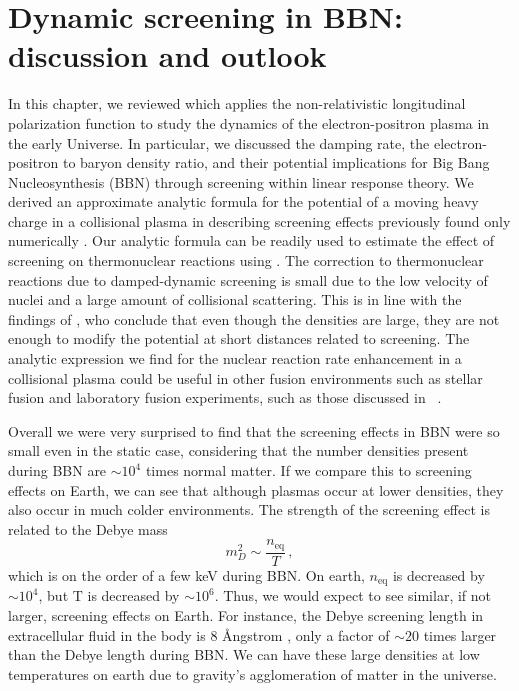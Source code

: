\section{Dynamic screening in BBN: discussion and outlook}\label{sec:Discussion}

In this chapter, we reviewed \cite{Grayson:2023flr} which applies the non-relativistic longitudinal polarization function to study the dynamics of the electron-positron plasma in the early Universe. In particular, we discussed the damping rate, the electron-positron to baryon density ratio, and their potential implications for Big Bang Nucleosynthesis (BBN) through screening within linear response theory. We derived an approximate analytic formula for the potential of a moving heavy charge in a collisional plasma in  describing screening effects previously found only numerically \cite{Hwang:2021kno}. Our analytic formula can be readily used to estimate the effect of screening on thermonuclear reactions using . The correction to thermonuclear reactions due to damped-dynamic screening is small due to the low velocity of nuclei and a large amount of collisional scattering. This is in line with the findings of \cite{Hwang:2021kno}, who conclude that even though the densities are large, they are not enough to modify the potential at short distances related to screening. The analytic expression we find for the nuclear reaction rate enhancement  in a collisional plasma could be useful in other fusion environments such as stellar fusion and laboratory fusion experiments, such as those discussed in ~\cite{Labaune:2013dla, Margarone:2022mdpi}.

Overall we were very surprised to find that the screening effects in BBN were so small even in the static case,  considering that the number densities present during BBN are $\sim 10^4$ times normal matter. If we compare this to screening effects on Earth, we can see that although plasmas occur at lower densities, they also occur in much colder environments. The strength of the screening effect is related to the Debye mass
\begin{equation}
m_D^2 \sim \frac{n_\text{eq} }{T}\,,
\end{equation}
which is on the order of a few keV during BBN. On earth, $n_\text{eq}$ is decreased by $\sim 10^4$, but T is decreased by $\sim 10^6$. Thus, we would expect to see similar, if not larger, screening effects on Earth. For instance, the Debye screening length in extracellular fluid in the body is 8 \AA ngstrom \cite{doi:10.1073/pnas.1914599117}, only a factor of $\sim 20$ times larger than the Debye length during BBN. We can have these large densities at low temperatures on earth due to gravity's agglomeration of matter in the universe.
